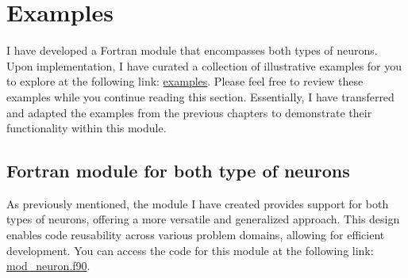 \section{Examples}
I have developed a Fortran module that encompasses both types of neurons. Upon implementation, I have
curated a collection of illustrative examples for you to explore at the following link:
\href{https://github.com/alecksandr26/fortran-ml/tree/main/examples}{examples}. Please feel free to review
these examples while you continue reading this section. Essentially, I have transferred and adapted the
examples from the previous chapters to demonstrate their functionality within this module.
\subsection{Fortran module for both type of neurons}
As previously mentioned, the module I have created provides support for both types of neurons, offering a
more versatile and generalized approach. This design enables code reusability across various problem domains,
allowing for efficient development. You can access the code for this module at the following link:
\href{https://github.com/alecksandr26/fortran-ml/blob/main/src/mod_neuron.f90}{mod\_neuron.f90}.

